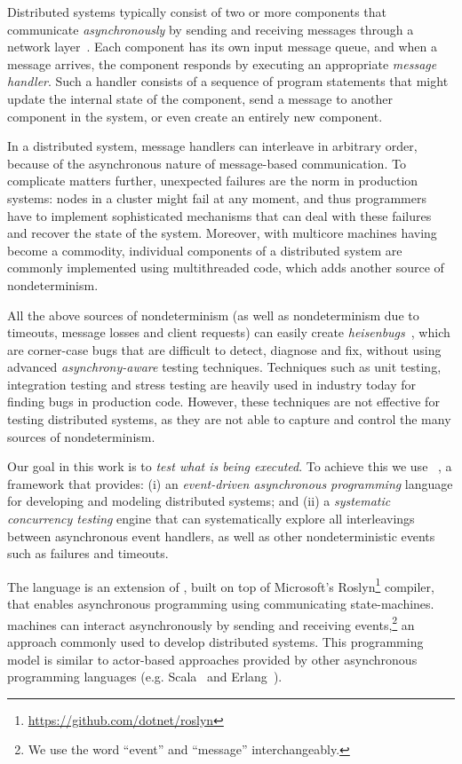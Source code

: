 Distributed systems typically consist of two or more components that communicate \emph{asynchronously} by sending and receiving messages through a network layer~\cite{lamport1978time}. Each component has its own input message queue, and when a message arrives, the component responds by executing an appropriate \emph{message handler}. Such a handler consists of a sequence of program statements that might update the internal state of the component, send a message to another component in the system, or even create an entirely new component.

In a distributed system, message handlers can interleave in arbitrary order, because of the asynchronous nature of message-based communication. To complicate matters further, unexpected failures are the norm in production systems: nodes in a cluster might fail at any moment, and thus programmers have to implement sophisticated mechanisms that can deal with these failures and recover the state of the system. Moreover, with multicore machines having become a commodity, individual components of a distributed system are commonly implemented using multithreaded code, which adds another source of nondeterminism.

All the above sources of nondeterminism (as well as nondeterminism due to timeouts, message losses and client requests) can easily create \emph{heisenbugs}~\cite{gray1986computers, musuvathi2008finding}, which are corner-case bugs that are difficult to detect, diagnose and fix, without using advanced \emph{asynchrony-aware} testing techniques. Techniques such as unit testing, integration testing and stress testing are heavily used in industry today for finding bugs in production code. However, these techniques are not effective for testing distributed systems, as they are not able to capture and control the many sources of nondeterminism.

Our goal in this work is to \emph{test what is being executed}. To achieve this we use \psharp~\cite{deligiannis2015psharp}, a framework that provides: (i) an \emph{event-driven asynchronous programming} language for developing and modeling distributed systems; and (ii) a \emph{systematic concurrency testing} engine that can systematically explore all interleavings between asynchronous event handlers, as well as other nondeterministic events such as failures and timeouts.

The \psharp language is an extension of \csharp, built on top of Microsoft's Roslyn\footnote{\url{https://github.com/dotnet/roslyn}} compiler, that enables asynchronous programming using communicating state-machines. \psharp machines can interact asynchronously by sending and receiving events,\footnote{We use the word ``event'' and ``message'' interchangeably.} an approach commonly used to develop distributed systems. This programming model is similar to actor-based approaches provided by other asynchronous programming languages (e.g. Scala~\cite{odersky2008programming} and Erlang~\cite{armstrong1996erlang}).

